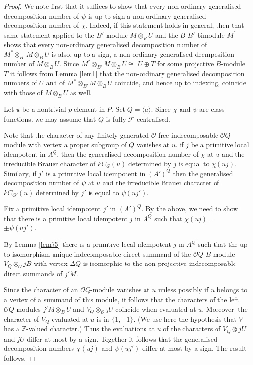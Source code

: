 \documentclass[10pt,a4paper]{amsart}
\def\CF{{\mathcal{F}}}    \def\OS{{\mathcal{O}S}}
\def\CO{{\mathcal{O}}}
\def\OQ{{\mathcal{O}Q}}
\def\Z{{\mathbb Z}}
\def\tenB{\otimes_B}
\def\tenO{\otimes_{\mathcal{O}}}
\def\ten{\otimes}
\begin{document}
\begin{proof}
We note first that
it suffices to show that every non-ordinary generalised decomposition
number of $\psi$ is up to sign  a non-ordinary generalised  
decomposition
number of $\chi$. Indeed, if this statement holds in general, then 
that same statement applied to the $B'$-module $M\tenB U$ and 
the $B$-$B'$-bimodule $M^*$ shows 
that every non-ordinary generalised decomposition number of $M^*\ten_{B'} M\tenB U$ is
also, up to a sign, a non-ordinary generalised decmposition number of
$M\tenB U$. Since $M^*\ten_{B'} M\tenB U\cong$ $U\oplus T$ for some projective
$B$-module $T$ it follows from Lemma \ref{lem1} that  the non-ordinary
generalised decomposition numbers of $U$ and of $M^*\ten_{B'} M\tenB U$
coincide, and hence up to indexing, coincide with those of $M\tenB U$ as well.

Let $u$ be a nontrivial $p$-element in $P$. Set $Q=\langle u\rangle$.
Since $\chi$ and $\psi$ are class functions, we may assume that $Q$ is
fully $\CF$-centralised.

Note that the character of any finitely generated $\CO$-free indecomposable 
$\OQ$-module with vertex a proper subgroup of $Q$ vanishes at $u$.
if $j$ be a primitive local idempotent in $A^Q$, then the generalised 
decomposition number of $\chi$ at $u$ and the irreducible Brauer character of $kC_G(u)$ 
determined by $j$ is equal to $\chi(uj)$. Similary, if $j'$ is a primitive local
idempotent in $(A')^Q$ then the generalised decomposition number  of
$\psi$ at $u$ and the irreducible  Brauer character  of $kC_{G'}(u)$ determined
by $j'$ is equal to $\psi(uj')$. 

Fix a primitive local idempotent $j'$ in $(A')^Q$. By the above, we need to 
show that there is a primitive local idempotent $j$ in $A^Q$ such that
$\chi(uj)=$ $\pm\psi(uj')$.

By Lemma \ref{lem75}  there is a primitive local
idempotent $j$ in $A^Q$ such that  the up to isomorphism 
unique indecomposable direct summand of the $\OQ$-$B$-module 
$V_Q\tenO jB$ with vertex $\Delta Q$ is isomorphic to the non-projective 
indecomposable direct summands of $j'M$.

Since the character of an $\OQ$-module vanishes at $u$ unless possibly
if $u$ belongs to a vertex of a summand of this module, it follows that
the characters of the left $\OQ$-modules $j'M\tenB U$ and
$V_Q\tenO jU$ coincide when evaluated at $u$. Moreover, the character of $V_Q$
evaluated at $u$ is in $\{1,-1\}$. (We use here the hypothesis that $V$  has a 
$\Z$-valued character.) Thus the evaluations at $u$ of the characters
of $V_Q\ten jU$ and $jU$ differ at most by a sign.
Together it follows that the generalised decomposition numbers
$\chi(uj)$ and $\psi(uj')$   differ at most by a sign. The result follows.
\end{proof}
\end{document}
